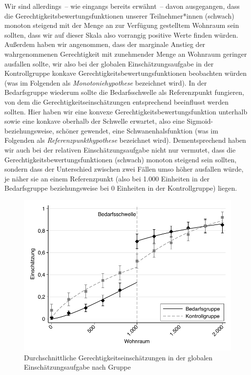 \documentclass[justified,nobib,nohyper,symmetric,twoside]{tufte-book}
\begin{document}
Wir sind allerdings~-- wie eingangs bereits erwähnt~-- davon ausgegangen, dass die Gerechtigkeitsbewertungsfunktionen unserer Teilnehmer*innen (schwach) monoton steigend mit der Menge an zur Verfügung gestelltem Wohnraum sein sollten, dass wir auf dieser Skala also vorrangig positive Werte finden würden.
Außerdem haben wir angenommen, dass der marginale Anstieg der wahrgenommenen Gerechtigkeit mit zunehmender Menge an Wohnraum geringer ausfallen sollte, wir also bei der globalen Einschätzungsaufgabe in der Kontrollgruppe konkave Gerechtigkeitsbewertungsfunktionen beobachten würden (was im Folgenden als \textit{Monotoniehypothese} bezeichnet wird).
In der Bedarfsgruppe wiederum sollte die Bedarfsschwelle als Referenzpunkt fungieren, von dem die Gerechtigkeitseinschätzungen entsprechend beeinflusst werden sollten.
Hier haben wir eine konvexe Gerechtigkeitsbewertungsfunktion unterhalb sowie eine konkave oberhalb der Schwelle erwartet, also eine Sigmoid- beziehungsweise, schöner gewendet, eine Schwanenhalsfunktion (was im Folgenden als \textit{Referenzpunkthypothese} bezeichnet wird).
Dementsprechend haben wir auch bei der relativen Einschätzungsaufgabe nicht nur vermutet, dass die Gerechtigkeitsbewertungsfunktionen (schwach) monoton steigend sein sollten, sondern dass der Unterschied zwischen zwei Fällen umso höher ausfallen würde, je näher sie an einem Referenzpunkt (also bei 1.000 Einheiten in der Bedarfsgruppe beziehungsweise bei 0 Einheiten in der Kontrollgruppe) liegen.

\begin{figure}[t]\label{fig:abbildung_1}
   \center
   \includegraphics[width=0.99\linewidth]{figure_1.pdf}
   \caption{Durch\-schnitt\-liche Gerechtigkeitseinschätzungen in der globalen Einschätzungsaufgabe nach Gruppe}
\end{figure}
\end{document}
